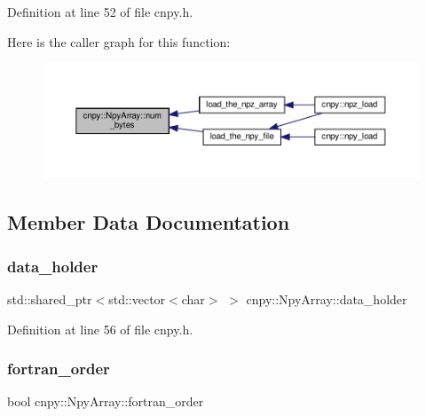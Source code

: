 Definition at line 52 of file cnpy.\+h.

Here is the caller graph for this function\+:
\nopagebreak
\begin{figure}[H]
\begin{center}
\leavevmode
\includegraphics[width=350pt]{structcnpy_1_1_npy_array_ae8004f74b07e6148d7342c2d063e12fc_icgraph}
\end{center}
\end{figure}


\subsection{Member Data Documentation}
\mbox{\label{structcnpy_1_1_npy_array_a274276ea92cf0839ee14a292f4d0dc2f}} 
\subsubsection{\texorpdfstring{data\+\_\+holder}{data\_holder}}
{\footnotesize\ttfamily std\+::shared\+\_\+ptr$<$std\+::vector$<$char$>$ $>$ cnpy\+::\+Npy\+Array\+::data\+\_\+holder}



Definition at line 56 of file cnpy.\+h.

\mbox{\label{structcnpy_1_1_npy_array_a073fe36f66efb1ef9229dafeac1c43c2}} 
\subsubsection{\texorpdfstring{fortran\+\_\+order}{fortran\_order}}
{\footnotesize\ttfamily bool cnpy\+::\+Npy\+Array\+::fortran\+\_\+order}



